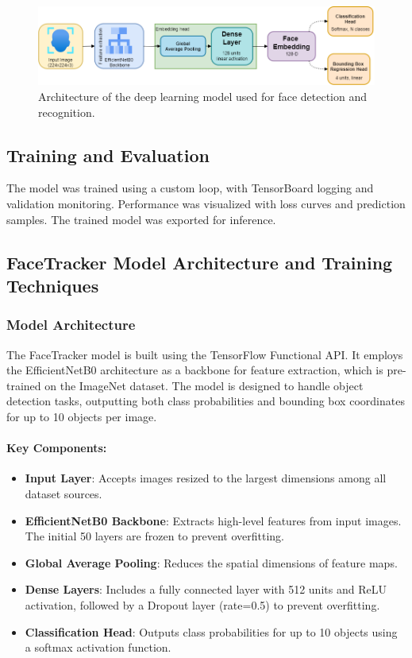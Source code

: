\begin{figure}[ht!]
    \centering
    \includegraphics[width=1\textwidth]{../Files/model_architecture.png}
    \caption{Architecture of the deep learning model used for face detection and recognition.}
    \label{fig:model-architecture}
\end{figure}

\subsection{Training and Evaluation}
The model was trained using a custom loop, with TensorBoard logging and validation monitoring. Performance was visualized with loss curves and prediction samples. The trained model was exported for inference.

\subsection{FaceTracker Model Architecture and Training Techniques}

\subsubsection{Model Architecture}
The FaceTracker model is built using the TensorFlow Functional API. It employs the EfficientNetB0 architecture as a backbone for feature extraction, which is pre-trained on the ImageNet dataset. The model is designed to handle object detection tasks, outputting both class probabilities and bounding box coordinates for up to 10 objects per image.

\paragraph{Key Components:}
\begin{itemize}
    \item \textbf{Input Layer}: Accepts images resized to the largest dimensions among all dataset sources.
    \item \textbf{EfficientNetB0 Backbone}: Extracts high-level features from input images. The initial 50 layers are frozen to prevent overfitting.
    \item \textbf{Global Average Pooling}: Reduces the spatial dimensions of feature maps.
    \item \textbf{Dense Layers}: Includes a fully connected layer with 512 units and ReLU activation, followed by a Dropout layer (rate=0.5) to prevent overfitting.
    \item \textbf{Classification Head}: Outputs class probabilities for up to 10 objects using a softmax activation function.
\end{itemize}

